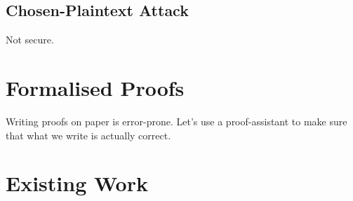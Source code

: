 \subsection{Chosen-Plaintext Attack}

Not secure.


% 
% 
% 

\section{Formalised Proofs}

Writing proofs on paper is error-prone.  Let's use a proof-assistant to make sure that what we write is actually
correct.

\section{Existing Work}

